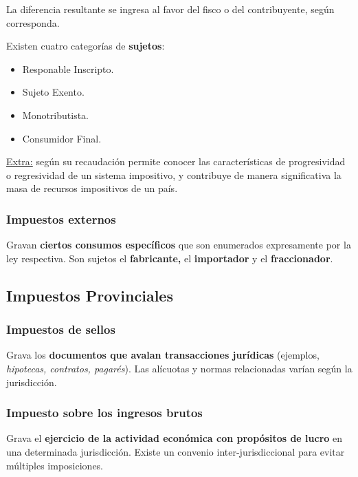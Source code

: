 \documentclass[10pt,a4paper]{article}
\begin{document}
La diferencia resultante se ingresa al favor del fisco o del contribuyente, según corresponda.

Existen cuatro categorías de \textbf{sujetos}:
\begin{multicols}{2}
\begin{itemize}
\item Responable Inscripto.
\item Sujeto Exento.
\item Monotributista.
\item Consumidor Final.
\end{itemize}
\end{multicols}

\underline{Extra:} según su recaudación permite conocer las características de progresividad o regresividad de un sistema impositivo, y contribuye de manera significativa la masa de recursos impositivos de un país.

\subsubsection{Impuestos externos}

Gravan \textbf{ciertos consumos específicos} que son enumerados expresamente por la ley respectiva. Son sujetos el \textbf{fabricante,} el \textbf{importador} y el \textbf{fraccionador}.

\subsection{Impuestos Provinciales}

\subsubsection{Impuestos de sellos}

Grava los \textbf{documentos que avalan transacciones jurídicas} (ejemplos, \textit{hipotecas, contratos, pagarés}). Las alícuotas y normas relacionadas varían según la jurisdicción.

\subsubsection{Impuesto sobre los ingresos brutos}

Grava el \textbf{ejercicio de la actividad económica con propósitos de lucro} en una determinada jurisdicción. Existe un convenio inter-jurisdiccional para evitar múltiples imposiciones.
\end{document}
